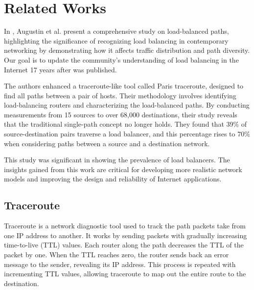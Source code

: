 \documentclass[12pt]{cwru_thesis}
\begin{document}







\chapter{Related Works}

In \cite{Augustin2007}, Augustin et al. present a comprehensive study on load-balanced paths, highlighting the significance of recognizing load balancing in contemporary networking by demonstrating how it affects traffic distribution and path diversity. Our goal is to update the community's understanding of load balancing in the Internet 17 years after \cite{Augustin2007} was published.

The authors enhanced a traceroute-like tool called Paris traceroute, designed to find all paths between a pair of hosts. Their methodology involves identifying load-balancing routers and characterizing the load-balanced paths. By conducting measurements from 15 sources to over 68,000 destinations, their study reveals that the traditional single-path concept no longer holds. They found that 39\% of source-destination pairs traverse a load balancer, and this percentage rises to 70\% when considering paths between a source and a destination network.

This study was significant in showing the prevalence of load balancers. The insights gained from this work are critical for developing more realistic network models and improving the design and reliability of Internet applications.

\section{Traceroute}

Traceroute is a network diagnostic tool used to track the path packets take from one IP address to another. It works by sending packets with gradually increasing time-to-live (TTL) values. Each router along the path decreases the TTL of the packet by one. When the TTL reaches zero, the router sends back an error message to the sender, revealing its IP address. This process is repeated with incrementing TTL values, allowing traceroute to map out the entire route to the destination.
\end{document}
